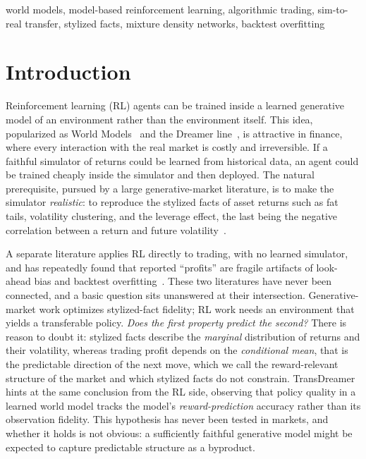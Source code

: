 \documentclass[conference]{IEEEtran}
\begin{document}
\begin{IEEEkeywords}
world models, model-based reinforcement learning, algorithmic trading, sim-to-real transfer, stylized facts, mixture density networks, backtest overfitting
\end{IEEEkeywords}

\section{Introduction}

Reinforcement learning (RL) agents can be trained inside a learned generative model of an environment rather than the environment itself. This idea, popularized as World Models~\cite{ha2018} and the Dreamer line~\cite{hafner2020,hafner2023}, is attractive in finance, where every interaction with the real market is costly and irreversible. If a faithful simulator of returns could be learned from historical data, an agent could be trained cheaply inside the simulator and then deployed. The natural prerequisite, pursued by a large generative-market literature, is to make the simulator \emph{realistic}: to reproduce the stylized facts of asset returns such as fat tails, volatility clustering, and the leverage effect, the last being the negative correlation between a return and future volatility~\cite{cont2001,takahashi2019,kwonlee2024,kim2025}.

A separate literature applies RL directly to trading, with no learned simulator, and has repeatedly found that reported ``profits'' are fragile artifacts of look-ahead bias and backtest overfitting~\cite{finrlmeta,gort2022,gym4real,yan2025}. These two literatures have never been connected, and a basic question sits unanswered at their intersection. Generative-market work optimizes stylized-fact fidelity; RL work needs an environment that yields a transferable policy. \emph{Does the first property predict the second?} There is reason to doubt it: stylized facts describe the \emph{marginal} distribution of returns and their volatility, whereas trading profit depends on the \emph{conditional mean}, that is the predictable direction of the next move, which we call the reward-relevant structure of the market and which stylized facts do not constrain. TransDreamer~\cite{chen2022} hints at the same conclusion from the RL side, observing that policy quality in a learned world model tracks the model's \emph{reward-prediction} accuracy rather than its observation fidelity. This hypothesis has never been tested in markets, and whether it holds is not obvious: a sufficiently faithful generative model might be expected to capture predictable structure as a byproduct.
\end{document}
